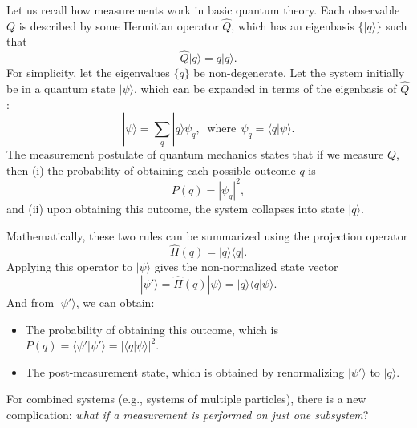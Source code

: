 \documentclass[pra,12pt]{revtex4-2}
\begin{document}
Let us recall how measurements work in basic quantum theory.  Each
observable $Q$ is described by some Hermitian operator $\hat{Q}$,
which has an eigenbasis $\{|q\rangle\}$ such that
\begin{equation}
  \hat{Q}|q\rangle = q |q\rangle.
\end{equation}
For simplicity, let the eigenvalues $\{q\}$ be non-degenerate.  Let
the system initially be in a quantum state $|\psi\rangle$, which can
be expanded in terms of the eigenbasis of $\hat{Q}$:
\begin{equation}
  |\psi\rangle = \sum_q |q\rangle \psi_q, \;\;\mathrm{where}\;\, \psi_q = \langle q|\psi\rangle.
  \label{psiexpansion}
\end{equation}
The measurement postulate of quantum mechanics states that if we
measure $Q$, then (i) the probability of obtaining each possible
outcome $q$ is
\begin{equation}
  P(q) = |\psi_q|^2,
  \label{Pq}
\end{equation}
and (ii) upon obtaining this outcome, the system collapses into state
$|q\rangle$.

Mathematically, these two rules can be summarized using the projection
operator
\begin{equation}
  \hat{\Pi}(q) = |q\rangle\langle q|.
  \label{project}
\end{equation}
Applying this operator to $|\psi\rangle$ gives the non-normalized
state vector
\begin{equation}
  |\psi'\rangle = \hat{\Pi}(q) |\psi\rangle = |q\rangle \langle q|\psi\rangle.
\end{equation}
And from $|\psi'\rangle$, we can obtain:
\begin{itemize}
\item The probability of obtaining this outcome, which is
  $P(q) = \langle\psi'|\psi'\rangle = |\langle q|\psi\rangle|^2$.

\item The post-measurement state, which is obtained by renormalizing
  $|\psi'\rangle$ to $|q\rangle$.
\end{itemize}

For combined systems (e.g., systems of multiple particles), there is a
new complication: \textit{what if a measurement is performed on just
  one subsystem}?
\end{document}
